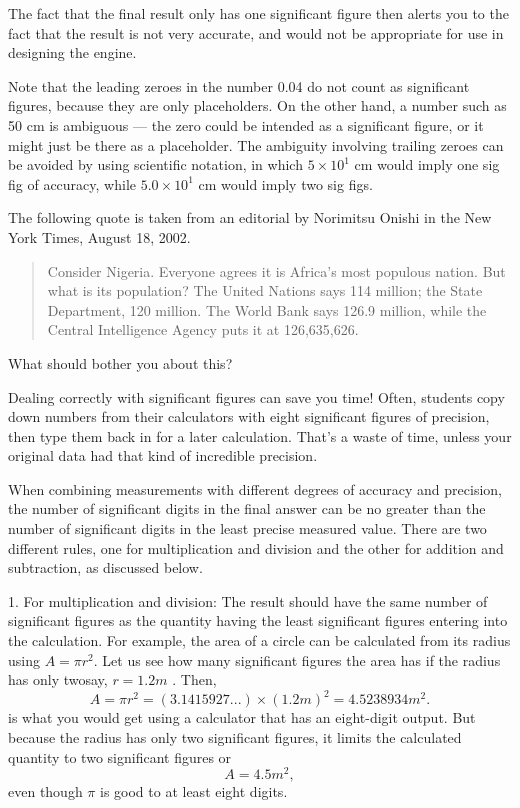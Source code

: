 \noindent The fact that the final result only has one significant
figure then alerts you to the fact that the result is not
very accurate, and would not be appropriate for use in
designing the engine.

Note that the leading zeroes in the number 0.04 do not count
as significant figures, because they are only placeholders.
On the other hand, a number such as 50 cm is ambiguous ---
the zero could be intended as a significant figure, or it
might just be there as a placeholder. The ambiguity
involving trailing zeroes can be avoided by using scientific
notation, in which $5\times10^1$  cm would imply one sig fig of
accuracy, while $5.0\times10^1$  cm would imply two sig figs.

\begin{exmp}
The following quote is taken from an editorial by
Norimitsu Onishi in the New York Times, August 18, 2002.

\noindent 
\begin{quote}
\noindent Consider Nigeria. Everyone agrees it is Africa's most
populous nation. But what is its population? The United
Nations says 114 million; the State Department, 120 million.
The World Bank says 126.9 million, while the Central
Intelligence Agency puts it at 126,635,626.
\end{quote}

\noindent What should bother you about this?
\end{exmp}
\divider

Dealing correctly with significant figures can save you
time! Often, students copy down numbers from their
calculators with eight significant figures of precision,
then type them back in for a later calculation. That's a
waste of time, unless your original data had that kind of
incredible precision.

When combining measurements with different degrees of accuracy and precision, the number of significant digits in the final answer can be no greater than the number of significant digits in the least precise measured value. There are two different rules, one for multiplication and division and the other for addition and subtraction, as discussed below.

1. For multiplication and division: The result should have the same number of significant figures as the quantity having the least significant figures entering into the calculation. For example, the area of a circle can be calculated from its radius using $A = \pi r^2$. Let us see how many significant figures the area has if the radius has only twosay, $r = 1.2 m$ . Then,
$$A = \pi r^2 = (3.1415927...)\times (1.2 m)^2 = 4.5238934 m^2.$$
is what you would get using a calculator that has an eight-digit output. But because the radius has only two significant figures, it limits the calculated quantity to two significant figures or
$$A=4.5 m^2,$$ 
even though $\pi$ is good to at least eight digits.

